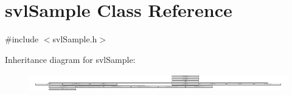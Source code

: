\hypertarget{classsvl_sample}{\section{svl\-Sample Class Reference}
\label{classsvl_sample}
}


{\ttfamily \#include $<$svl\-Sample.\-h$>$}

Inheritance diagram for svl\-Sample\-:\begin{figure}[H]
\begin{center}
\leavevmode
\includegraphics[height=0.785965cm]{dd/d7c/classsvl_sample}
\end{center}
\end{figure}
